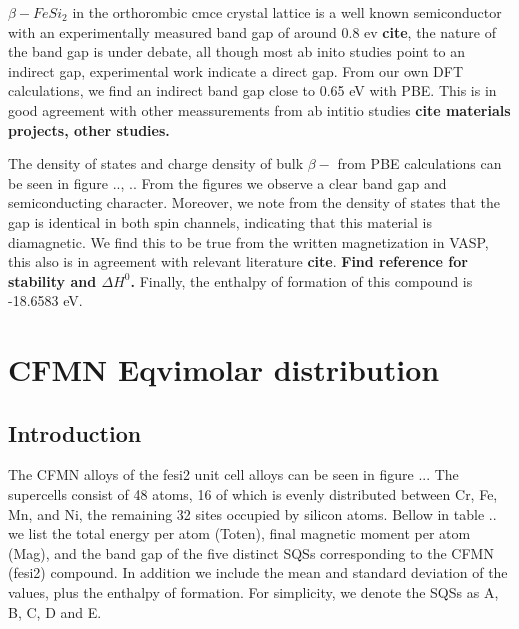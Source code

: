 $\beta-FeSi_2$ in the orthorombic cmce crystal lattice is a well known semiconductor with an experimentally measured band gap of around 0.8 ev \textbf{cite}, the nature of the band gap is under debate, all though most ab inito studies point to an indirect gap, experimental work indicate a direct gap. From our own DFT calculations, we find an indirect band gap close to 0.65 eV with PBE. This is in good agreement with other meassurements from ab intitio studies \textbf{cite materials projects, other studies.} 

The density of states and charge density of bulk $\beta-$ from PBE calculations can be seen in figure .., ..  From the figures we observe a clear band gap and semiconducting character. Moreover, we note from the density of states that the gap is identical in both spin channels, indicating that this material is diamagnetic. We find this to be true from the written magnetization in VASP, this also is in agreement with relevant literature \textbf{cite}. \textbf{Find reference for stability and $\Delta H^0$.} Finally, the enthalpy of formation of this compound is -18.6583 eV.

\section{CFMN Eqvimolar distribution}

\subsection{Introduction}

The CFMN alloys of the fesi2 unit cell alloys can be seen in figure ... The supercells consist of 48 atoms, 16 of which is evenly distributed between Cr, Fe, Mn, and Ni, the remaining 32 sites occupied by silicon atoms. Bellow in table .. we list the total energy per atom (Toten), final magnetic moment per atom (Mag), and the band gap of the five distinct SQSs corresponding to the CFMN (fesi2) compound. In addition we include the mean and standard deviation of the values, plus the enthalpy of formation. For simplicity, we denote the SQSs as A, B, C, D and E.

